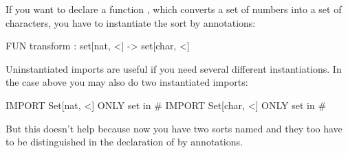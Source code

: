 If you want to declare a function , which converts a
set of numbers into a set of characters, you have to instantiate the
sort  by annotations:
\begin{prog}
      FUN transform : set[nat, <] -> set[char, <]
\end{prog}

Uninstantiated imports are useful if you need several different
instantiations. In the case above you may also do two
instantiated imports:
\begin{prog}
      IMPORT Set[nat, <] ONLY set in #
      IMPORT Set[char, <] ONLY set in #
\end{prog}
But this doesn't help because now you have two sorts named 
and they too have to be distinguished in the declaration of
 by annotations.



